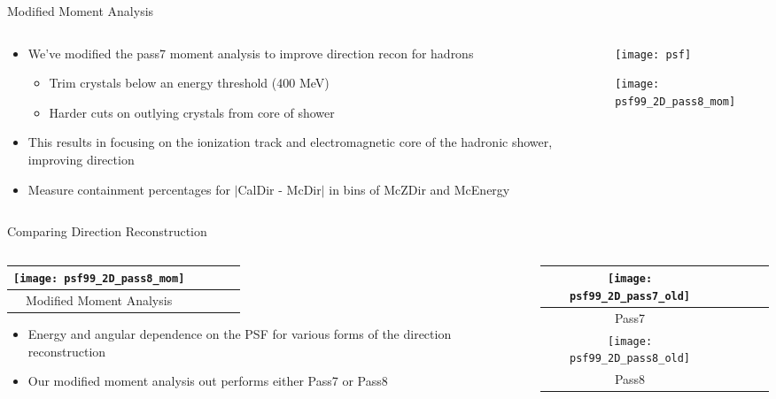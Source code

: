 \documentclass[10pt, table]{beamer}
\begin{document}
\begin{frame}{Modified Moment Analysis}
\begin{columns}[t]
	\begin{column}[T]{0.5 \textwidth}
		\begin{itemize}
			\item We've modified the pass7 moment analysis to improve direction recon for hadrons
			\begin{itemize}
				\item Trim crystals below an energy threshold (400 MeV)
				\item Harder cuts on outlying crystals from core of shower
			\end{itemize}
			\item This results in focusing on the ionization track and electromagnetic core of the hadronic shower, improving direction
			\item Measure containment percentages for $|$CalDir - McDir$|$ in bins of McZDir and McEnergy
		\end{itemize}
	\end{column}
	\begin{column}[T]{0.5 \textwidth}
	          \texttt{[image: psf]}
	          
	          \texttt{[image: psf99\_2D\_pass8\_mom]}
	\end{column}
\end{columns}	
\end{frame}


\begin{frame}{Comparing Direction Reconstruction}

	\begin{columns}[t]
	\begin{column}[T]{0.5 \textwidth}
	  \begin{tabular}{|c|c|c|cl} \hline
		          \texttt{[image: psf99\_2D\_pass8\_mom]} \\ \hline
		            Modified Moment Analysis \\ \hline
		            \end{tabular}
	\begin{itemize}
	\item Energy and angular dependence on the PSF for various forms of the direction reconstruction
	\item Our modified moment analysis out performs either Pass7  or Pass8
	\end{itemize}
	\end{column}
	\begin{column}[T]{0.5 \textwidth}
		  \begin{tabular}{|c|c|c|cl} \hline
		          \texttt{[image: psf99\_2D\_pass7\_old]} \\ \hline
		          Pass7 \\ \hline
		          \texttt{[image: psf99\_2D\_pass8\_old]} \\ \hline
		           Pass8 \\ \hline
		            \end{tabular}
	\end{column}
\end{columns}	
\end{frame}
\end{document}
